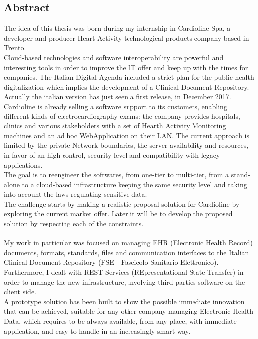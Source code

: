 \thispagestyle{empty}
\begin{center}
    {\chapter*{Abstract}} %
\end{center}
\label{abstract}

The idea of this thesis was born during my internship in Cardioline Spa, a developer and producer Heart Activity technological products company based in Trento.\\Cloud-based technologies and software interoperability are powerful and interesting tools in order to improve the IT offer and keep up with the times for companies. The Italian Digital Agenda included a strict plan for the public health digitalization which implies the development of a Clinical Document Repository. Actually the italian version has just seen a first release, in December 2017.\\Cardioline is already selling a software support to its customers, enabling different kinds of electrocardiography exams: the company provides hospitals, clinics and various stakeholders with a set of Hearth Activity Monitoring machines and an ad hoc WebApplication on their LAN. The current approach is limited by the private Network boundaries, the server availability and resources, in favor of an high control, security level and compatibility with legacy applications.\\The goal is to reengineer the softwares, from one-tier to multi-tier, from a stand-alone to a cloud-based infrastructure keeping the same security level and taking into account the laws regulating sensitive data.\\ The challenge starts by making a realistic proposal solution for Cardioline by exploring the current market offer. Later it will be to develop the proposed solution by respecting each of the constraints.\\ \\My work in particular was focused on managing EHR (Electronic Health Record) documents, formats, standards, files and communication interfaces to the Italian Clinical Document Repository (FSE - Fascicolo Sanitario Elettronico).\\Furthermore, I dealt with REST-Services (REpresentational State Transfer) in order to manage the new infrastructure, involving third-parties software on the client side.\\A prototype solution has been built to show the possible immediate innovation that can be achieved, suitable for any other company managing Electronic Health Data, which requires to be always available, from any place, with immediate application, and easy to handle in an increasingly smart way.